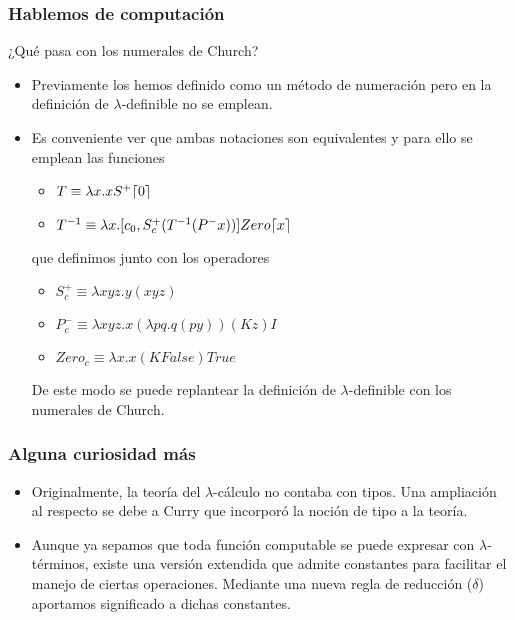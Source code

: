 \documentclass[spanish, a4paper, 12pt, final, slideColor, nototal, colorBG, pdf, noaccumulate, darkblue] {beamer}
\DeclarePairedDelimiter{\ceil}{\lceil}{\rceil}
\begin{document}
\begin{frame}
    \frametitle{Hablemos de computación}
    ¿Qué pasa con los numerales de Church?\\
    \begin{itemize}
        \item Previamente los hemos definido como un método de numeración pero en la definición de $\lambda$-definible no se emplean.
        \item Es conveniente ver que ambas notaciones son equivalentes y para ello se emplean las funciones
        \begin{itemize}
            \item $T \equiv \lambda x.xS^{+}\ceil{0}$
            \item $T^{-1} \equiv \lambda x.[c_0, S^{+}_c (T^{-1}(P^{-}x))]Zero \ceil{x}$
        \end{itemize}
        que definimos junto con los operadores
        \begin{itemize}
            \item $S^{+}_c \equiv \lambda xyz.y(xyz)$
            \item $P^{-}_c \equiv \lambda xyz.x(\lambda pq.q(py))(Kz)I$
            \item $Zero_c \equiv \lambda x.x(K False)True$
        \end{itemize}
        De este modo se puede replantear la definición de $\lambda$-definible con los numerales de Church.
    \end{itemize}
\end{frame}
\begin{frame}
    \frametitle{Alguna curiosidad más}
    \begin{itemize}
        \item Originalmente, la teoría del $\lambda$-cálculo no contaba con tipos. Una ampliación al respecto se debe a Curry que incorporó la noción de tipo a la teoría.
        \item Aunque ya sepamos que toda función computable se puede expresar con $\lambda$-términos, existe una versión extendida que admite constantes para facilitar el manejo de ciertas operaciones. Mediante una nueva regla de reducción ($\delta$) aportamos significado a dichas constantes.
    \end{itemize}
\end{frame}
\end{document}
